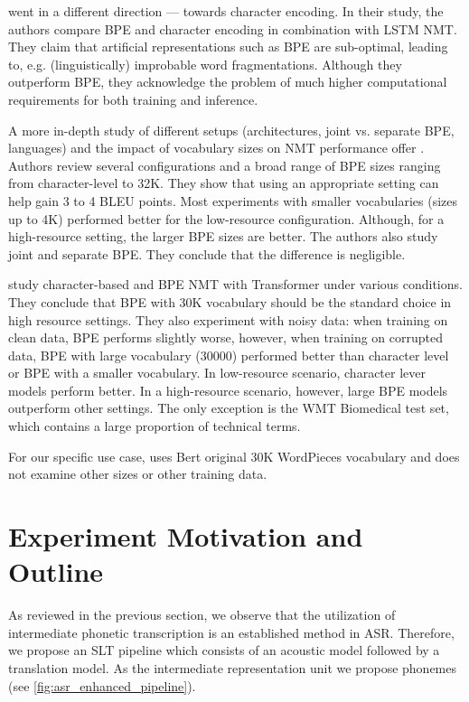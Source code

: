  went in a different direction --- towards character encoding. In their study, the authors compare BPE and character encoding in combination with LSTM NMT. They claim that artificial representations such as BPE are sub-optimal, leading to, e.g. (linguistically) improbable word fragmentations. Although they outperform BPE, they acknowledge the problem of much higher computational requirements for both training and inference.

A more in-depth study of different setups (architectures, joint vs. separate BPE, languages) and the impact of vocabulary sizes on NMT performance offer . Authors review several configurations and a broad range of BPE sizes ranging from character-level to 32K. They show that using an appropriate setting can help gain 3 to 4 BLEU points. Most experiments with smaller vocabularies (sizes up to 4K) performed better for the low-resource configuration. Although, for a high-resource setting, the larger BPE sizes are better. The authors also study joint and separate BPE. They conclude that the difference is negligible.


 study character-based and BPE NMT with Transformer under various conditions. They conclude that BPE with 30K vocabulary should be the standard choice in high resource settings. They also experiment with noisy data: when training on clean data, BPE performs slightly worse, however, when training on corrupted data, BPE with large vocabulary (30000) performed better than character level or BPE with a smaller vocabulary. In low-resource scenario, character lever models perform better. In a high-resource scenario, however, large BPE models outperform other settings. The only exception is the WMT Biomedical test set, which contains a large proportion of technical terms.

For our specific use case,  uses Bert  original 30K WordPieces vocabulary and does not examine other sizes or other training data.

\pagebreak
\section{Experiment Motivation and Outline}
\label{easr:eperiment}
As reviewed in the previous section, we observe that the utilization of intermediate phonetic transcription is an established method in ASR. Therefore, we propose an SLT pipeline which consists of an acoustic model followed by a translation model. As the intermediate representation unit we propose phonemes (see \cref{fig:asr_enhanced_pipeline}). 

